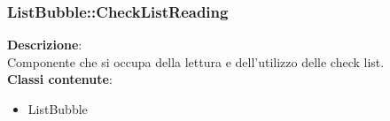 \clearpage

\subsubsection{ListBubble::CheckListReading}
   \FloatBarrier
\FloatBarrier
\textbf{Descrizione}:\\
 Componente che si occupa della lettura e dell'utilizzo delle check list. 
\\ \textbf{Classi contenute}:\\
\begin{itemize}
\item ListBubble
\end{itemize}


\clearpage

